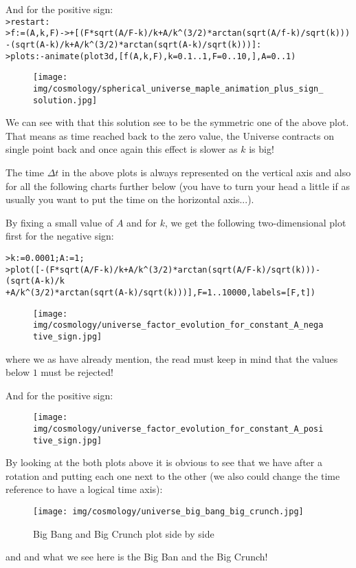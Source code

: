 	And for the positive sign:\\
	
	\texttt{>restart:\\
	>f:=(A,k,F)->+[(F*sqrt(A/F-k)/k+A/k\string^(3/2)*arctan(sqrt(A/f-k)/sqrt(k)))\\
	-(sqrt(A-k)/k+A/k\string^(3/2)*arctan(sqrt(A-k)/sqrt(k)))]:\\
	>plots:-animate(plot3d,[f(A,k,F),k=0.1..1,F=0..10,],A=0..1)
	}
	\begin{figure}[H]
		\begin{center}
		\texttt{[image: img/cosmology/spherical\_universe\_maple\_animation\_plus\_sign\_solution.jpg]}
		\end{center}
	\end{figure}
	We can see with that this solution see to be the symmetric one of the above plot. That means as time reached back to the zero value, the Universe contracts on single point back and once again this effect is slower as $k$ is big! 
	
	\begin{tcolorbox}[title=Remark,colframe=black,arc=10pt]
	The time $\Delta t$ in the above plots is always represented on the vertical axis and also for all the following charts further below (you have to turn your head a little if as usually you want to put the time on the horizontal axis...).
	\end{tcolorbox}
	By fixing a small value of $A$ and for $k$, we get the following two-dimensional plot first for the negative sign:
	
	\texttt{>k:=0.0001;A:=1;\\
	 >plot([-(F*sqrt(A/F-k)/k+A/k\string^(3/2)*arctan(sqrt(A/F-k)/sqrt(k)))-(sqrt(A-k)/k\\
	+A/k\string^(3/2)*arctan(sqrt(A-k)/sqrt(k)))],F=1..10000,labels=[F,t])}
	\begin{figure}[H]
		\begin{center}
		\texttt{[image: img/cosmology/universe\_factor\_evolution\_for\_constant\_A\_negative\_sign.jpg]}
		\end{center}
	\end{figure}
	where we as have already mention, the read must keep in mind that the values below $1$ must be rejected!
	
	And for the positive sign:
	\begin{figure}[H]
		\begin{center}
		\texttt{[image: img/cosmology/universe\_factor\_evolution\_for\_constant\_A\_positive\_sign.jpg]}
		\end{center}
	\end{figure}
	By looking at the both plots above it is obvious to see that we have after a rotation and putting each one next to the other (we also could change the time reference to have a logical time axis):
	\begin{figure}[H]
		\centering
		\texttt{[image: img/cosmology/universe\_big\_bang\_big\_crunch.jpg]}
		\caption{Big Bang and Big Crunch plot side by side}
	\end{figure}
	and and what we see here is the Big Ban and the Big Crunch!
	
